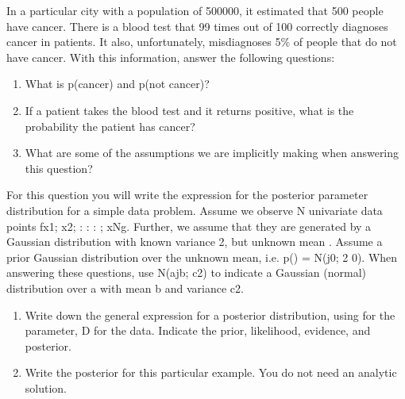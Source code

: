 \documentclass{../amsml}
\begin{document}

\begin{problem}
In a particular city with a population of 500000, it estimated that 500 people have cancer. There is a blood test that 99 times out of 100 correctly diagnoses cancer in patients. It also, unfortunately, misdiagnoses 5\% of people that do not have cancer. With this information, answer the following questions:

\begin{enumerate}
	\item What is p(cancer) and p(not cancer)?
	\item If a patient takes the blood test and it returns positive, what is the probability the patient has cancer?
	\item What are some of the assumptions we are implicitly making when answering this question?

\end{enumerate}
\end{problem}


\begin{problem} %
For this question you will write the expression for the posterior parameter distribution for a simple data problem. Assume we observe N univariate data points fx1; x2; : : : ; xNg. Further, we assume that they are generated by a Gaussian distribution with known variance 2, but unknown mean . Assume a prior Gaussian distribution over the unknown mean, i.e. p() = N(j0; 2 0). When answering these questions, use N(ajb; c2) to indicate a Gaussian (normal) distribution over a with mean b and variance c2.

\begin{enumerate}
	\item Write down the general expression for a posterior distribution, using  for the parameter, D for the data. Indicate the prior, likelihood, evidence, and posterior.
		
	\item Write the posterior for this particular example. You do not need an
	analytic solution.

\end{enumerate}
\end{problem}
\end{document}
